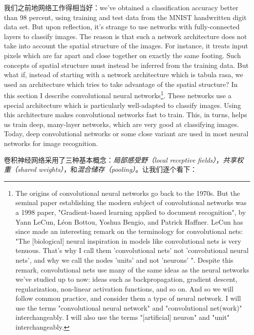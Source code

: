 我们之前地网络工作得相当好：we've obtained a classification accuracy better than
98 percent, using training and test data from the MNIST handwritten digit data
set. But upon reflection, it's strange to use networks with fully-connected
layers to classify images. The reason is that such a network architecture does
not take into account the spatial structure of the images. For instance, it
treats input pixels which are far apart and close together on exactly the same
footing. Such concepts of spatial structure must instead be inferred from the
training data. But what if, instead of starting with a network architecture
which is tabula rasa, we used an architecture which tries to take advantage of
the spatial structure? In this section I describe convolutional neural
networks\footnote{The origins of convolutional neural networks go back to the
  1970s. But the seminal paper establishing the modern subject of convolutional
  networks was a 1998 paper, "Gradient-based learning applied to document
  recognition", by Yann LeCun, Léon Bottou, Yoshua Bengio, and Patrick
  Haffner. LeCun has since made an interesting remark on the terminology for
  convolutional nets: "The [biological] neural inspiration in models like
  convolutional nets is very tenuous. That's why I call them 'convolutional
  nets' not 'convolutional neural nets', and why we call the nodes 'units' and
  not 'neurons' ". Despite this remark, convolutional nets use many of the same
  ideas as the neural networks we've studied up to now: ideas such as
  backpropagation, gradient descent, regularization, non-linear activation
  functions, and so on. And so we will follow common practice, and consider them
  a type of neural network. I will use the terms "convolutional neural network"
  and "convolutional net(work)" interchangeably. I will also use the terms
  "[artificial] neuron" and "unit" interchangeably.}. These networks use a
special architecture which is particularly well-adapted to classify
images. Using this architecture makes convolutional networks fast to
train. This, in turns, helps us train deep, many-layer networks, which are very
good at classifying images. Today, deep convolutional networks or some close
variant are used in most neural networks for image recognition.

卷积神经网络采用了三种基本概念：\emph{局部感受野（local
  receptive fields）}，\emph{共享权重（shared weights）}，和\emph{混合储存（pooling）}。让我们逐个看下：\\

